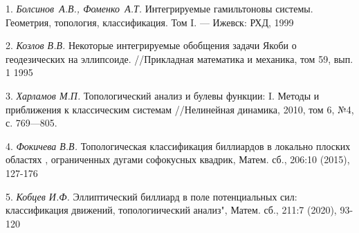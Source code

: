 \litlist

1. {\it Болсинов~А.В.,  Фоменко~А.Т. } Интегрируемые гамильтоновы системы.  Геометрия, топология, классификация.
Том I. --- Ижевск: РХД, 1999
\par 2. {\it  Козлов В.В. } Некоторые интегрируемые обобщения задачи Якоби о геодезических на эллипсоиде. //Прикладная математика и механика, том 59, вып. 1 1995
\par 3. {\it  Харламов М.П. } Топологический анализ и булевы функции: I. Методы и приближения к классическим системам //Нелинейная динамика, 2010, том 6, №4, с. 769---805.
\par 4. {\it  Фокичева В.В.  } Топологическая классификация биллиардов в локально плоских областях , ограниченных дугами софокусных квадрик, Матем. сб., 206:10 (2015), 127-176
\par 5. {\it Кобцев И.Ф.  } Эллиптический биллиард в поле потенциальных сил: классификация движений, топологиический анализ", Матем. сб., 211:7 (2020), 93-120

